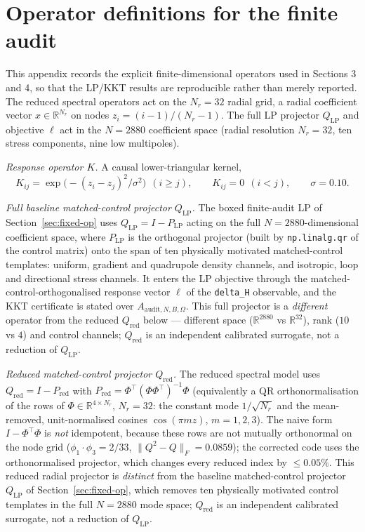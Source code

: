 \documentclass[11pt,a4paper]{article}
\begin{document}
\section{Operator definitions for the finite audit}\label{app:operators}

This appendix records the explicit finite-dimensional operators used in Sections 3 and 4, so that the LP/KKT results are reproducible rather than merely reported. The reduced spectral operators act on the $N_{r}=32$ radial grid, a radial coefficient vector $x\in\mathbb{R}^{N_{r}}$ on nodes $z_{i}=(i-1)/(N_{r}-1)$. The full LP projector $Q_{\mathrm{LP}}$ and objective $\ell$ act in the $N=2880$ coefficient space (radial resolution $N_{r}=32$, ten stress components, nine low multipoles).

\emph{Response operator $K$.} A causal lower-triangular kernel,
\[
K_{ij}=\exp\!\bigl(-(z_{i}-z_{j})^{2}/\sigma^{2}\bigr)\ \ (i\ge j),\qquad K_{ij}=0\ \ (i<j),\qquad \sigma=0.10 .
\]

\emph{Full baseline matched-control projector $Q_{\mathrm{LP}}$.} The boxed finite-audit LP of Section~\ref{sec:fixed-op} uses $Q_{\mathrm{LP}}=I-P_{\mathrm{LP}}$ acting on the full $N=2880$-dimensional coefficient space, where $P_{\mathrm{LP}}$ is the orthogonal projector (built by \texttt{np.linalg.qr} of the control matrix) onto the span of ten physically motivated matched-control templates: uniform, gradient and quadrupole density channels, and isotropic, loop and directional stress channels. It enters the LP objective through the matched-control-orthogonalised response vector $\ell$ of the \texttt{delta\_H} observable, and the KKT certificate is stated over $A_{\mathrm{audit},N,B,\Omega}$. This full projector is a \emph{different} operator from the reduced $Q_{\mathrm{red}}$ below --- different space ($\mathbb{R}^{2880}$ vs $\mathbb{R}^{32}$), rank ($10$ vs $4$) and control channels; $Q_{\mathrm{red}}$ is an independent calibrated surrogate, not a reduction of $Q_{\mathrm{LP}}$.

\emph{Reduced matched-control projector $Q_{\mathrm{red}}$.} The reduced spectral model uses $Q_{\mathrm{red}}=I-P_{\mathrm{red}}$ with $P_{\mathrm{red}}=\Phi^{\top}(\Phi\Phi^{\top})^{-1}\Phi$ (equivalently a QR orthonormalisation of the rows of $\Phi\in\mathbb{R}^{4\times N_{r}}$, $N_{r}=32$: the constant mode $1/\sqrt{N_{r}}$ and the mean-removed, unit-normalised cosines $\cos(\pi m z)$, $m=1,2,3$). The naive form $I-\Phi^{\top}\Phi$ is \emph{not} idempotent, because these rows are not mutually orthonormal on the node grid ($\phi_{1}\!\cdot\!\phi_{3}=2/33$, $\|Q^{2}-Q\|_{F}=0.0859$); the corrected code uses the orthonormalised projector, which changes every reduced index by $\leq0.05\%$. This reduced radial projector is \emph{distinct} from the baseline matched-control projector $Q_{\mathrm{LP}}$ of Section~\ref{sec:fixed-op}, which removes ten physically motivated control templates in the full $N=2880$ mode space; $Q_{\mathrm{red}}$ is an independent calibrated surrogate, not a reduction of $Q_{\mathrm{LP}}$.
\end{document}
